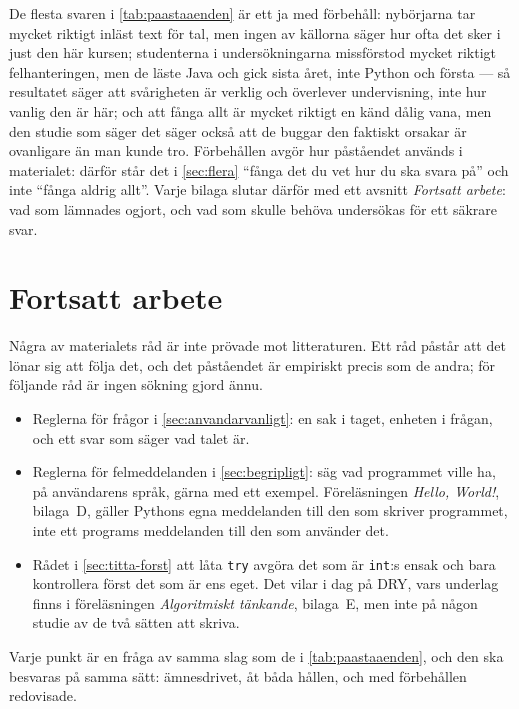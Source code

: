 De flesta svaren i \cref{tab:paastaaenden} är ett ja med förbehåll:
nybörjarna tar mycket riktigt inläst text för tal, men ingen av
källorna säger hur ofta det sker i just den här kursen; studenterna i
undersökningarna missförstod mycket riktigt felhanteringen, men de läste
Java och gick sista året, inte Python och första --- så resultatet säger
att svårigheten är verklig och överlever undervisning, inte hur vanlig
den är här; och att fånga allt är mycket riktigt en känd dålig vana, men
den studie som säger det säger också att de buggar den faktiskt orsakar
är ovanligare än man kunde tro.  Förbehållen avgör hur påståendet
används i materialet: därför står det i \cref{sec:flera} \enquote{fånga
det du vet hur du ska svara på} och inte \enquote{fånga aldrig allt}.
Varje bilaga slutar därför med ett avsnitt \emph{Fortsatt arbete}: vad
som lämnades ogjort, och vad som skulle behöva undersökas för ett
säkrare svar.

\section{Fortsatt arbete}
\label{sec:verifiera-fortsatt}

Några av materialets råd är inte prövade mot litteraturen.  Ett råd påstår
att det lönar sig att följa det, och det påståendet är empiriskt precis
som de andra; för följande råd är ingen sökning gjord ännu.
\begin{itemize}
  \item Reglerna för frågor i \cref{sec:anvandarvanligt}: en sak i
    taget, enheten i frågan, och ett svar som säger vad talet är.
  \item Reglerna för felmeddelanden i \cref{sec:begripligt}: säg vad
    programmet ville ha, på användarens språk, gärna med ett exempel.
    Föreläsningen \emph{Hello, World!}, bilaga~D, gäller Pythons egna
    meddelanden till den som skriver programmet, inte ett programs
    meddelanden till den som använder det.
  \item Rådet i \cref{sec:titta-forst} att låta
    \texttt{try} avgöra det som är
    \texttt{int}:s ensak och bara kontrollera först det som
    är ens eget.  Det vilar i dag på DRY, vars underlag finns i
    föreläsningen \emph{Algoritmiskt tänkande}, bilaga~E, men inte på
    någon studie av de två sätten att skriva.
\end{itemize}
Varje punkt är en fråga av samma slag som de i
\cref{tab:paastaaenden}, och den ska besvaras på samma sätt: ämnesdrivet,
åt båda hållen, och med förbehållen redovisade.

